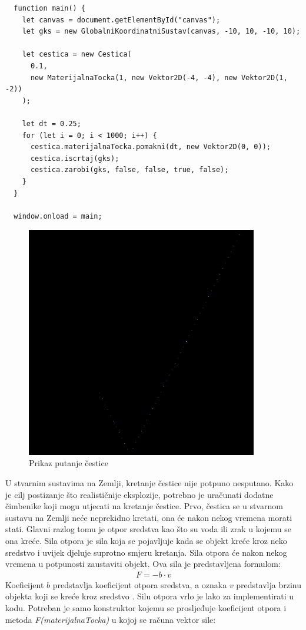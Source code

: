 \documentclass{foi}
\begin{document}
\begin{verbatim}
  function main() {
    let canvas = document.getElementById("canvas");
    let gks = new GlobalniKoordinatniSustav(canvas, -10, 10, -10, 10);

    let cestica = new Cestica(
      0.1,
      new MaterijalnaTocka(1, new Vektor2D(-4, -4), new Vektor2D(1, -2))
    );

    let dt = 0.25;
    for (let i = 0; i < 1000; i++) {
      cestica.materijalnaTocka.pomakni(dt, new Vektor2D(0, 0));
      cestica.iscrtaj(gks);
      cestica.zarobi(gks, false, false, true, false);
    }
  }
  
  window.onload = main;
\end{verbatim}
\begin{figure}[H]
    \centering
    \includegraphics[width=0.9\textwidth]{slike/10_PutanjaCestice.png}
    \captionsetup{justification=centering}
    \caption{Prikaz putanje čestice}
\label{fig:PutanjaCestice}
\end{figure}

U stvarnim sustavima na Zemlji, kretanje čestice nije potpuno nesputano. Kako je cilj postizanje što realističnije eksplozije, potrebno je uračunati dodatne čimbenike koji mogu utjecati na kretanje čestice. Prvo, čestica se u stvarnom sustavu na Zemlji neće neprekidno kretati, ona će nakon nekog vremena morati stati. Glavni razlog tomu je otpor sredstva kao što su voda ili zrak u kojemu se ona kreće. Sila otpora je sila koja se pojavljuje kada se objekt kreće kroz neko sredstvo i uvijek djeluje suprotno smjeru kretanja. Sila otpora će nakon nekog vremena u potpunosti zaustaviti objekt. Ova sila je predstavljena formulom:
 \begin{align*}
F = -b\cdot v
\end{align*}
Koeficijent $b$ predstavlja koeficijent otpora sredstva, a oznaka $v$ predstavlja brzinu objekta koji se kreće kroz sredstvo \parencite{UTKLabPhys135}. Silu otpora vrlo je lako za implementirati u kodu. Potreban je samo konstruktor kojemu se prosljeđuje koeficijent otpora i metoda \textit{F(materijalnaTocka)} u kojoj se računa vektor sile:
\end{document}
